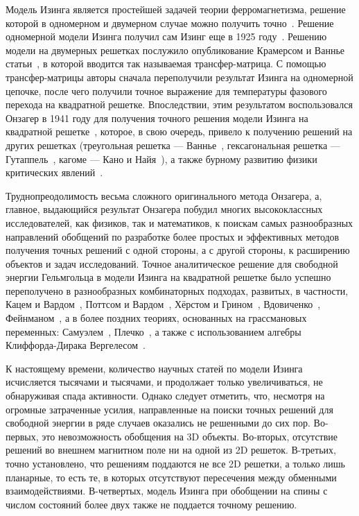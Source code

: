 Модель Изинга является простейшей задачей теории ферромагнетизма, решение которой в одномерном и двумерном случае можно получить точно~\cite{baxter1985}. Решение одномерной модели Изинга получил сам Изинг еще в 1925 году~\cite{ising1925}. Решению модели на двумерных решетках послужило опубликование Крамерсом и Ваннье статьи~\cite{kramers_wannier1, kramers_wannier2}, в которой вводится так называемая трансфер-матрица. С помощью трансфер-матрицы авторы сначала переполучили результат Изинга на одномерной цепочке, после чего получили точное выражение для температуры фазового перехода на квадратной решетке. Впоследствии, этим результатом воспользовался Онзагер в 1941 году для получения точного решения модели Изинга на квадратной решетке~\cite{onsager1941}, которое, в свою очередь, привело к получению решений на других решетках (треугольная решетка --- Ваннье~\cite{wannier1950}, гексагональная решетка --- Гутаппель~\cite{houtapell1950}, кагоме --- Кано и Найя~\cite{kano_naya1953}), а также бурному развитию физики критических явлений~\cite{yang1952, brush1967, mussardo2010}. 

Труднопреодолимость весьма сложного оригинального метода Онзагера, а, главное, выдающийся результат Онзагера побудил многих высококлассных исследователей, как физиков, так и математиков, к поискам самых разнообразных направлений обобщений по разработке более простых и эффективных методов получения точных решений с одной стороны, а с другой стороны, к расширению объектов и задач исследований. Точное аналитическое решение для свободной энергии Гельмгольца в модели Изинга на квадратной решетке было успешно переполучено в разнообразных комбинаторных подходах, развитых, в частности, Кацем и Вардом~\cite{kac1952}, Поттсом и Вардом~\cite{potts1955}, Хёрстом и Грином~\cite{hurst1960}, Вдовиченко~\cite{vdovichenko1965_1, vdovichenko1965_2}, Фейнманом~\cite{feynmann1972}, а в более поздних теориях, основанных на грассмановых переменных: Самуэлем~\cite{samuel1980}, Плечко~\cite{plechko1985}, а также с использованием алгебры Клиффорда-Дирака Вергелесом~\cite{vergeles2009}.

К настоящему времени, количество научных статей по модели Изинга исчисляется тысячами и тысячами, и продолжает только увеличиваться, не обнаруживая спада активности. Однако следует отметить, что, несмотря на огромные затраченные усилия, направленные на поиски точных решений для свободной энергии в ряде случаев оказались не решенными до сих пор. Во-первых, это невозможность обобщения на 3D объекты. Во-вторых, отсутствие решений во внешнем магнитном поле ни на одной из 2D решеток. В-третьих, точно установлено, что решениям поддаются не все 2D решетки, а только лишь планарные, то есть те, в которых отсутствуют пересечения между обменными взаимодействиями. В-четвертых, модель Изинга при обобщении на спины с числом состояний более двух также не поддается точному решению. 


